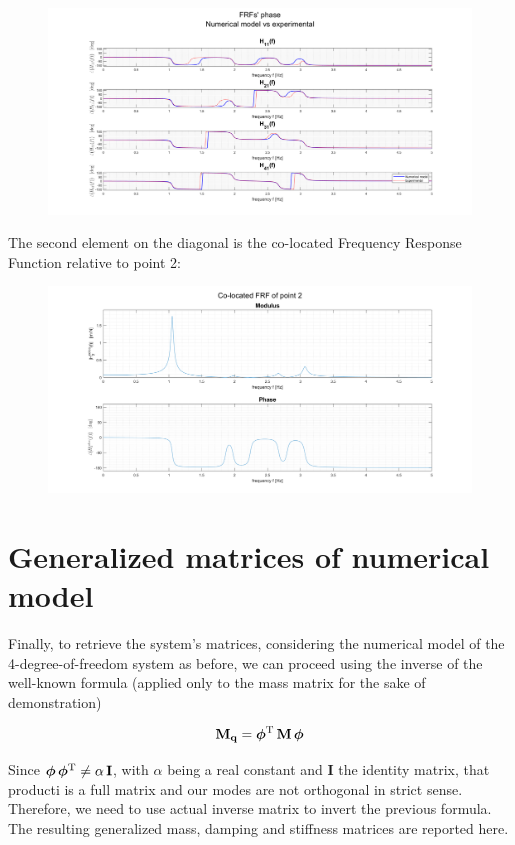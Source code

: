 \documentclass[a4paper,12pt,oneside]{article}
\begin{document}
\begin{figure}[H]
	\hspace{-70pt}
	\includegraphics[scale=0.4]{frfs_num_vs_exp_phase}
\end{figure}

The second element on the diagonal is the co-located Frequency Response Function relative to point 2:

\begin{figure}[H]
	\hspace{-70pt}
	\includegraphics[scale=0.4]{co-located_point2}
\end{figure}


\section{Generalized matrices of numerical model}

Finally, to retrieve the system's matrices, considering the numerical model of the 4-degree-of-freedom system as before, we can proceed using the inverse of the well-known formula (applied only to the mass matrix for the sake of demonstration)

\[
	\mathbf{M_q} = \bm{\phi}^\textup{T} \, \mathbf{M} \, \bm{\phi}
\]

Since $ \bm{\phi} \, \bm{\phi}^\textup{T} \neq \alpha \, \mathbf{I} $, with $ \alpha $ being a real constant and $ \mathbf{I} $ the identity matrix, that producti is a full matrix and our modes are not orthogonal in strict sense. Therefore, we need to use actual inverse matrix to invert the previous formula. The resulting generalized mass, damping and stiffness matrices are reported here.
\end{document}
